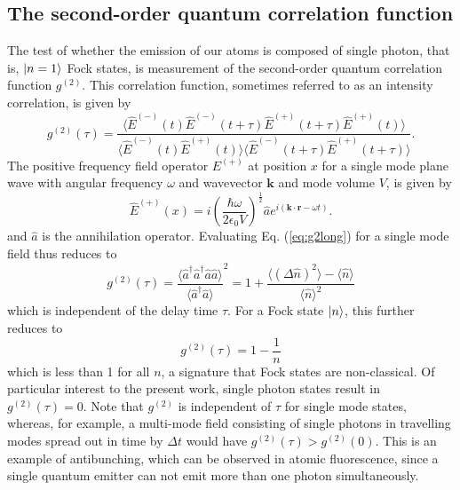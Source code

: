 \subsection{The second-order quantum correlation function}
The test of whether the emission of our atoms is composed of single photon, that is, $\ket{n=1}$ Fock states, is measurement of the second-order quantum correlation function $g^{(2)}$. This correlation function, sometimes referred to as an intensity correlation, is given by\cite{gerry2004introductory}
\begin{equation}\label{eq:g2long}
    g^{(2)}(\tau) = \frac{\langle \hat{E}^{(-)}(t) \hat{E}^{(-)}(t+\tau) \hat{E}^{(+)}(t+\tau) \hat{E}^{(+)}(t) \rangle}{\langle \hat{E}^{(-)}(t) \hat{E}^{(+)}(t) \rangle \langle \hat{E}^{(-)}(t+\tau) \hat{E}^{(+)}(t+\tau) \rangle}.
\end{equation}
The positive frequency field operator $E^{(+)}$ at position $x$ for a single mode plane wave with angular frequency $\omega$ and wavevector $\mathbf{k}$ and mode volume $V$, is given by
\begin{equation}\label{eq:Epositive}
    \hat{E}^{(+)}(x) = i \left(\frac{\hbar \omega}{2 \epsilon_0 V}\right)^{\frac{1}{2}} \hat{a} e^{i(\mathbf{k\cdot r} - \omega t)}.
\end{equation}
and $\hat{a}$ is the annihilation operator. Evaluating Eq. (\ref{eq:g2long}) for a single mode field thus reduces to
\begin{equation}\label{eq:g2singlemode}
    g^{(2)}(\tau) = \frac{\langle \hat{a}^{\dagger}\hat{a}^{\dagger}\hat{a}\hat{a} \rangle}{\langle \hat{a}^{\dagger}\hat{a} \rangle}^2 = 1 + \frac{\langle (\Delta \hat{n})^2 \rangle - \langle \hat{n} \rangle}{\langle \hat{n} \rangle^2}
\end{equation}
which is independent of the delay time $\tau$. For a Fock state $\ket{n}$, this further reduces to 
\begin{equation}\label{eq:g2fock}
    g^{(2)}(\tau) = 1 - \frac{1}{n}
\end{equation}
which is less than 1 for all $n$, a signature that Fock states are non-classical. Of particular interest to the present work, single photon states result in $g^{(2)}(\tau)=0$. Note that $g^{(2)}$ is independent of $\tau$ for single mode states, whereas, for example, a multi-mode field consisting of single photons in travelling modes spread out in time by $\Delta t$ would have $g^{(2)}(\tau) > g^{(2)}(0)$. This is an example of antibunching, which can be observed in atomic fluorescence\cite{schubert1992photon,volz2007atom}, since a single quantum emitter can not emit more than one photon simultaneously.

